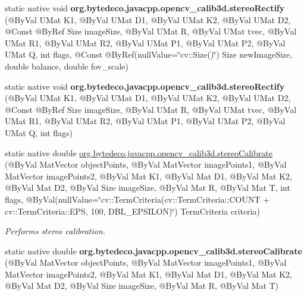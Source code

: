 \begin{DoxyCompactItemize}
static native void {\bfseries org.\+bytedeco.\+javacpp.\+opencv\+\_\+calib3d.\+stereo\+Rectify} (@By\+Val U\+Mat K1, @By\+Val U\+Mat D1, @By\+Val U\+Mat K2, @By\+Val U\+Mat D2, @Const @By\+Ref Size image\+Size, @By\+Val U\+Mat R, @By\+Val U\+Mat tvec, @By\+Val U\+Mat R1, @By\+Val U\+Mat R2, @By\+Val U\+Mat P1, @By\+Val U\+Mat P2, @By\+Val U\+Mat Q, int flags, @Const @By\+Ref(null\+Value=\char`\"{}cv\+::\+Size()\char`\"{}) Size new\+Image\+Size, double balance, double fov\+\_\+scale)
\item 
\mbox{\label{group__calib3d__fisheye_gad96122fa95c4d5cf5e635372416efba9}} 
static native void {\bfseries org.\+bytedeco.\+javacpp.\+opencv\+\_\+calib3d.\+stereo\+Rectify} (@By\+Val U\+Mat K1, @By\+Val U\+Mat D1, @By\+Val U\+Mat K2, @By\+Val U\+Mat D2, @Const @By\+Ref Size image\+Size, @By\+Val U\+Mat R, @By\+Val U\+Mat tvec, @By\+Val U\+Mat R1, @By\+Val U\+Mat R2, @By\+Val U\+Mat P1, @By\+Val U\+Mat P2, @By\+Val U\+Mat Q, int flags)
\item 
static native double \hyperlink{group__calib3d__fisheye_ga0134bbb31283b93ec8331c3b34923cd0}{org.\+bytedeco.\+javacpp.\+opencv\+\_\+calib3d.\+stereo\+Calibrate} (@By\+Val Mat\+Vector object\+Points, @By\+Val Mat\+Vector image\+Points1, @By\+Val Mat\+Vector image\+Points2, @By\+Val Mat K1, @By\+Val Mat D1, @By\+Val Mat K2, @By\+Val Mat D2, @By\+Val Size image\+Size, @By\+Val Mat R, @By\+Val Mat T, int flags, @By\+Val(null\+Value=\char`\"{}cv\+::\+Term\+Criteria(cv\+::\+Term\+Criteria\+::\+C\+O\+U\+NT + cv\+::\+Term\+Criteria\+::\+E\+PS, 100, D\+B\+L\+\_\+\+E\+P\+S\+I\+L\+ON)\char`\"{}) Term\+Criteria criteria)
\begin{DoxyCompactList}\small\item\em Performs stereo calibration. \end{DoxyCompactList}\item 
\mbox{\label{group__calib3d__fisheye_gaa2b57d96851b9fdc58a749f171f60510}} 
static native double {\bfseries org.\+bytedeco.\+javacpp.\+opencv\+\_\+calib3d.\+stereo\+Calibrate} (@By\+Val Mat\+Vector object\+Points, @By\+Val Mat\+Vector image\+Points1, @By\+Val Mat\+Vector image\+Points2, @By\+Val Mat K1, @By\+Val Mat D1, @By\+Val Mat K2, @By\+Val Mat D2, @By\+Val Size image\+Size, @By\+Val Mat R, @By\+Val Mat T)
\item 
\mbox{\label{group__calib3d__fisheye_gaf53ce6d812054fcc4c6846ab368a5c75}} 

\end{DoxyCompactItemize}

